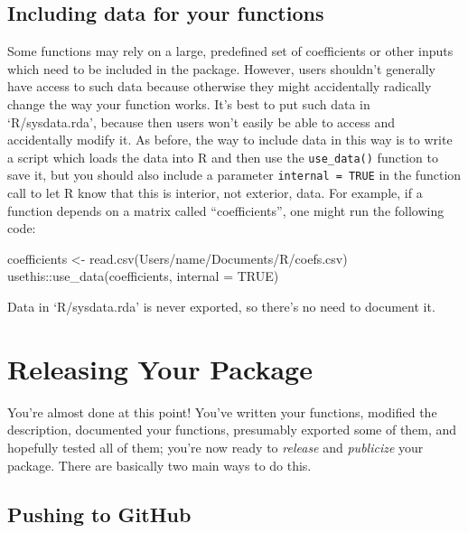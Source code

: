 \documentclass[
]{book}
\newenvironment{Shaded}{\begin{snugshade}}{\end{snugshade}}
\newcommand{\AttributeTok}[1]{\textcolor[rgb]{0.77,0.63,0.00}{#1}}
\newcommand{\ConstantTok}[1]{\textcolor[rgb]{0.00,0.00,0.00}{#1}}
\newcommand{\FunctionTok}[1]{\textcolor[rgb]{0.00,0.00,0.00}{#1}}
\newcommand{\NormalTok}[1]{#1}
\newcommand{\OtherTok}[1]{\textcolor[rgb]{0.56,0.35,0.01}{#1}}
\newcommand{\SpecialCharTok}[1]{\textcolor[rgb]{0.00,0.00,0.00}{#1}}
\newcommand{\StringTok}[1]{\textcolor[rgb]{0.31,0.60,0.02}{#1}}
\begin{document}
\hypertarget{including-data-for-your-functions}{%
\subsection{Including data for your functions}\label{including-data-for-your-functions}}

Some functions may rely on a large, predefined set of coefficients or other inputs which need to be included in the package. However, users shouldn't generally have access to such data because otherwise they might accidentally radically change the way your function works. It's best to put such data in `R/sysdata.rda', because then users won't easily be able to access and accidentally modify it. As before, the way to include data in this way is to write a script which loads the data into R and then use the \texttt{use\_data()} function to save it, but you should also include a parameter \texttt{internal\ =\ TRUE} in the function call to let R know that this is interior, not exterior, data. For example, if a function depends on a matrix called ``coefficients'', one might run the following code:

\begin{Shaded}
\begin{Highlighting}[]
\NormalTok{coefficients }\OtherTok{\textless{}{-}} \FunctionTok{read.csv}\NormalTok{(}\StringTok{\textquotesingle{}Users/name/Documents/R/coefs.csv\textquotesingle{}}\NormalTok{)}
\NormalTok{usethis}\SpecialCharTok{::}\FunctionTok{use\_data}\NormalTok{(coefficients, }\AttributeTok{internal =} \ConstantTok{TRUE}\NormalTok{)}
\end{Highlighting}
\end{Shaded}

Data in `R/sysdata.rda' is never exported, so there's no need to document it.

\hypertarget{releasing-your-package}{%
\section{Releasing Your Package}\label{releasing-your-package}}

You're almost done at this point! You've written your functions, modified the description, documented your functions, presumably exported some of them, and hopefully tested all of them; you're now ready to \emph{release} and \emph{publicize} your package. There are basically two main ways to do this.

\hypertarget{pushing-to-github}{%
\subsection{Pushing to GitHub}\label{pushing-to-github}}
\end{document}
